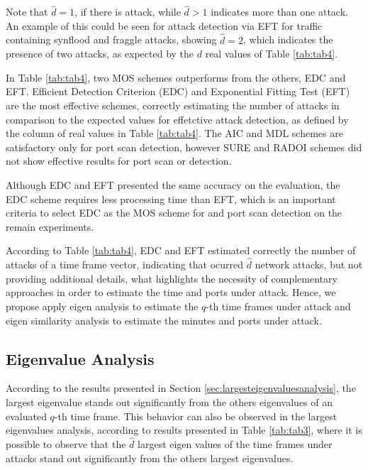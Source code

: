 \documentclass[review]{elsarticle}
\providecommand{\DIFaddtex}[1]{{\protect\color{blue}\uwave{#1}}} %
\providecommand{\DIFaddbegin}{} %
\providecommand{\DIFaddend}{} %
\providecommand{\DIFadd}[1]{\texorpdfstring{\DIFaddtex{#1}}{#1}} %
\begin{document}
Note that $\hat{d} = 1$, if there is attack, while $\hat{d} > 1$ indicates more than one attack. An example of this could be seen for attack detection via EFT for traffic containing synflood and fraggle attacks, showing $\hat{d} = 2$, which indicates the presence of two attacks, as expected by the $d$ real values of Table \ref{tab:tab4}. 

In Table \ref{tab:tab4}, two MOS schemes outperforms from the others, EDC and EFT. Efficient Detection Criterion (EDC) and Exponential Fitting Test (EFT) are the most effective schemes, correctly estimating the number of attacks in comparison to the expected values for effetctive attack detection, as defined by the column of real values in Table \ref{tab:tab4}. The AIC and MDL schemes are satisfactory only for port scan detection, however SURE and RADOI schemes did not show effective results for port scan or \DIFaddbegin \DIFadd{flood }\DIFaddend detection.

Although EDC and EFT presented the same accuracy on the evaluation, the EDC scheme requires less processing time than EFT, which is an important criteria to select EDC as the MOS scheme for \DIFaddbegin \DIFadd{flood }\DIFaddend and port scan detection on the remain experiments.

According to Table \ref{tab:tab4}, EDC and EFT estimated correctly the number of attacks of a time frame vector, indicating that ocurred $\hat{d}$ network attacks, but not providing additional details, what highlights the necessity of complementary approaches in order to estimate the time and ports under attack. Hence, we propose apply eigen analysis to estimate the $q$-th time frames under attack and eigen similarity analysis to estimate the minutes and ports under attack.

\subsection{Eigenvalue Analysis}
\label{sec:EigenvalueAnalysis}

According to the results presented in Section \ref{sec:largesteigenvaluesanalysis}, the largest eigenvalue stands out significantly from the others eigenvalues of an evaluated $q$-th time frame. This behavior can also be observed in the largest eigenvalues analysis, according to results presented in Table \ref{tab:tab3}, where it is possible to observe that the $\hat{d}$ largest eigen values of the time frames under attacks stand out significantly from the others largest eigenvalues. 
\end{document}
